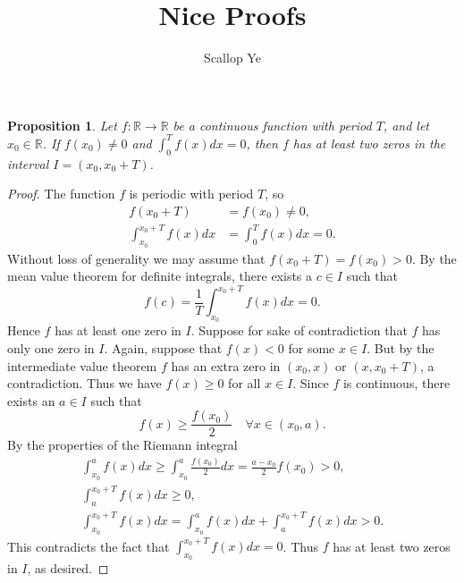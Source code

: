 \documentclass{amsart}
\title{Nice Proofs}
\author{Scallop Ye}
\newtheorem{proposition}{Proposition}
\begin{document}
\maketitle

\begin{proposition}
    Let $f:\mathbb{R}\to\mathbb{R}$ be a continuous function with period $T$, and let $x_0\in\mathbb{R}$.
    If $f(x_0)\neq0$ and $\int_{0}^{T}f(x)dx=0$, then $f$ has
    at least two zeros in the interval $I=(x_0,x_0+T)$.
\end{proposition}

\begin{proof}
    The function $f$ is periodic with period $T$, so
    \begin{align*}
        f(x_0+T)                 & =f(x_0)\neq0,          \\
        \int_{x_0}^{x_0+T}f(x)dx & =\int_{0}^{T}f(x)dx=0.
    \end{align*}
    Without loss of generality we may assume that $f(x_0+T)=f(x_0)>0$.
    By the mean value theorem for definite integrals, there exists a $c\in I$ such that
    \[f(c)=\frac{1}{T}\int_{x_0}^{x_0+T}f(x)dx=0.\]
    Hence $f$ has at least one zero in $I$. Suppose for sake of contradiction that
    $f$ has only one zero in $I$. Again, suppose that
    $f(x)<0$ for some $x\in I$. But by the intermediate value theorem
    $f$ has an extra zero in $(x_0,x)$ or $(x,x_0+T)$, a contradiction. Thus we have $f(x)\ge0$ for all $x\in I$.
    Since $f$ is continuous, there exists an $a\in I$ such that
    \[f(x)\ge\frac{f(x_0)}{2}\quad\forall x\in(x_0,a).\]
    By the properties of the Riemann integral
    \begin{align*}
        \int_{x_0}^{a}f(x)dx\ge\int_{x_0}^{a}\frac{f(x_0)}{2}dx=\frac{a-x_0}{2}f(x_0)>0,\\
        \int_{a}^{x_0+T}f(x)dx\ge0,\\
        \int_{x_0}^{x_0+T}f(x)dx=\int_{x_0}^{a}f(x)dx+\int_{a}^{x_0+T}f(x)dx>0.
    \end{align*}
    This contradicts the fact that $\int_{x_0}^{x_0+T}f(x)dx=0$.
    Thus $f$ has at least two zeros in $I$, as desired.
\end{proof}
\end{document}
